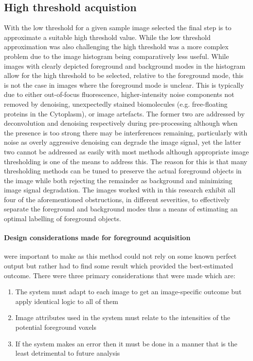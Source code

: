 \subsection{High threshold acquistion}
With the low threshold for a given sample image selected the final step is to approximate a suitable high threshold value. While the low threshold approximation was also challenging the high threshold was a more complex problem due to the image histogram being comparatively less useful. While images with clearly depicted foreground and background modes in the histogram allow for the high threshold to be selected, relative to the foreground mode, this is not the case in images where the foreground mode is unclear. This is typically due to either out-of-focus fluorescence, higher-intensity noise components not removed by denoising, unexpectedly stained biomolecules (e.g. free-floating proteins in the Cytoplasm), or image artefacts. The former two are addressed by deconvolution and denoising respectively during pre-processing although when the presence is too strong there may be interferences remaining, particularly with noise as overly aggressive denoising can degrade the image signal, yet the latter two cannot be addressed as easily with most methods although appropriate image thresholding is one of the means to address this. The reason for this is that many thresholding methods can be tuned to preserve the actual foreground objects in the image while both rejecting the remainder as background and minimizing image signal degradation. The images worked with in this research exhibit all four of the aforementioned obstructions, in different severities, to effectively separate the foreground and background modes thus a means of estimating an optimal labelling of foreground objects. \paragraph{Design considerations made for foreground acquisition} were important to make as this method could not rely on some known perfect output but rather had to find some result which provided the best-estimated outcome. There were three primary considerations that were made which are:
\begin{enumerate}
    \item The system must adapt to each image to get an image-specific outcome but apply identical logic to all of them
    \item Image attributes used in the system must relate to the intensities of the potential foreground voxels
    \item If the system makes an error then it must be done in a manner that is the least detrimental to future analysis
\end{enumerate}
